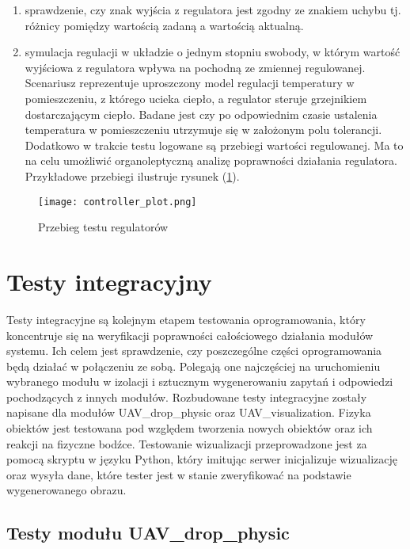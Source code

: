 \begin{enumerate}
\item sprawdzenie, czy znak wyjścia z regulatora jest zgodny ze znakiem uchybu tj. różnicy pomiędzy wartością zadaną a wartością aktualną.
\item symulacja regulacji w układzie o jednym stopniu swobody, w którym wartość wyjściowa z regulatora wpływa na pochodną ze zmiennej regulowanej. Scenariusz reprezentuje uproszczony model regulacji temperatury w pomieszczeniu, z którego ucieka ciepło, a regulator steruje grzejnikiem dostarczającym ciepło. Badane jest czy po odpowiednim czasie ustalenia temperatura w pomieszczeniu utrzymuje się w założonym polu tolerancji. Dodatkowo w trakcie testu logowane są przebiegi wartości regulowanej. Ma to na celu umożliwić organoleptyczną analizę poprawności działania regulatora. Przykładowe przebiegi ilustruje rysunek (\ref{controller_plot}).
\end{enumerate}

\begin{figure}[!th]
	\centering
	\texttt{[image: controller\_plot.png]}
	\caption{Przebieg testu regulatorów}
	\label{controller_plot}
\end{figure}
\newpage

\section{Testy integracyjny}

Testy integracyjne są kolejnym etapem testowania oprogramowania, który koncentruje się na weryfikacji poprawności całościowego działania modułów systemu. Ich celem jest sprawdzenie, czy poszczególne części oprogramowania będą działać w połączeniu ze sobą. Polegają one najczęściej na uruchomieniu wybranego modułu w izolacji i sztucznym wygenerowaniu zapytań i odpowiedzi pochodzących z innych modułów. Rozbudowane testy integracyjne zostały napisane dla modułów UAV\_drop\_physic oraz UAV\_visualization. Fizyka obiektów jest testowana pod względem tworzenia nowych obiektów oraz ich reakcji na fizyczne bodźce. Testowanie wizualizacji przeprowadzone jest za pomocą skryptu w języku Python, który imitując serwer inicjalizuje wizualizację oraz wysyła dane, które tester jest w stanie zweryfikować na podstawie wygenerowanego obrazu.

\subsection{Testy modułu UAV\_drop\_physic}

